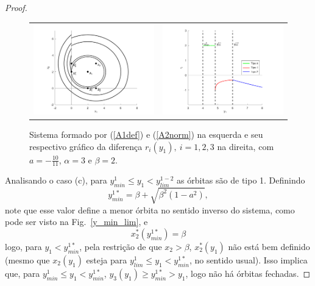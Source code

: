 \begin{proof}
\begin{figure}[H]
\centering
\begin{table}[H]
\centering
\begin{tabular}{cc}
\includegraphics[width=7cm]{images/1.1x1_yeqx_zzaft.png}
&
\includegraphics[width=7cm]{images/1.1x1_yeqx_zzaft_diff.png}
\end{tabular}
\end{table}
\caption{\centering\label{prepb}Sistema formado por (\ref{A1def}) e (\ref{A2norm}) na esquerda e seu respectivo gráfico da diferença $r_i(y_1),\  i=1,2,3$ na direita, com $a=-\frac{10}{11}$, $\alpha=3$ e $\beta=2$.}
\end{figure}

Analisando o caso (c), para $y_{min}^1\leq y_1<y_{lim}^{1-2}$ as órbitas são de tipo 1. Definindo
\begin{equation}
\label{y_min_inverse}
y_{min}^{1*}=\beta+\sqrt{\beta^2(1-a^2)},
\end{equation}
note que esse valor define a menor órbita no sentido inverso do sistema, como pode ser visto na Fig.~\ref{y_min_lim}, e
$$
x_2^*\left(y_{min}^{1*}\right)=\beta
$$
logo, para $y_1<y_{min}^{1*}$, pela restrição de que $x_2>\beta$, $x_2^*(y_1)$ não está bem definido (mesmo que $x_2(y_1)$ esteja para $y_{lim}^1\leq y_1<y_{min}^{1*}$, no sentido usual). Isso implica que, para $y_{min}^1\leq y_1<y_{min}^{1*}$, $y_3(y_1)\geq y_{min}^{1*}>y_1$, logo não há órbitas fechadas.


\end{proof}
